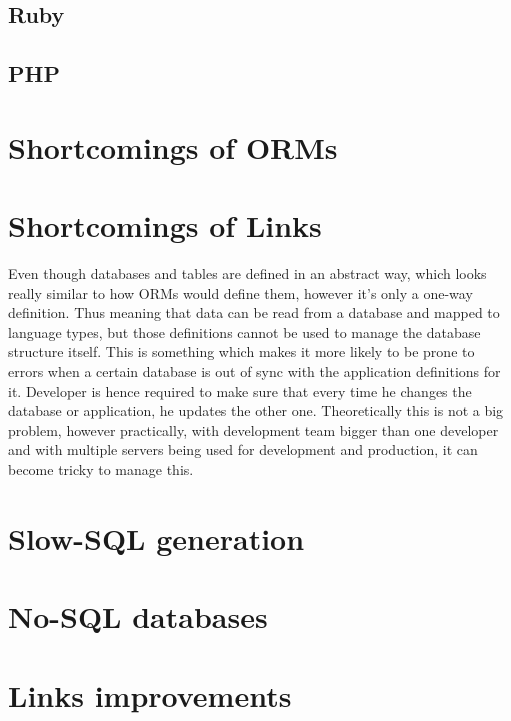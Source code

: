 \subsection{Ruby}

\subsection{PHP}

\section{Shortcomings of ORMs}

\section{Shortcomings of Links}

Even though databases and tables are defined in an abstract way, which looks really similar to how ORMs would define them, however it's only a one-way definition. Thus meaning that data can be read from a database and mapped to language types, but those definitions cannot be used to manage the database structure itself. This is something which makes it more likely to be prone to errors when a certain database is out of sync with the application definitions for it. Developer is hence required to make sure that every time he changes the database or application, he updates the other one. Theoretically this is not a big problem, however practically, with development team bigger than one developer and with multiple servers being used for development and production, it can become tricky to manage this. 

\section{Slow-SQL generation}

\section{No-SQL databases}

\section{Links improvements}
